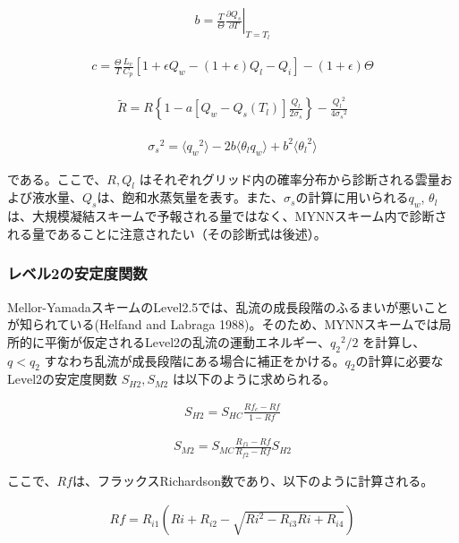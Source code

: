 \begin{eqnarray}b=\frac{T}{\Theta}\left.\frac{\partial Q_s}{\partial T}\right|_{T=T_l}\end{eqnarray}

\begin{eqnarray}c=\frac{\Theta}{T}\frac{L_v}{C_p}\left[1+\epsilon Q_w-(1+\epsilon)Q_l-Q_i\right]-(1+\epsilon)\Theta\end{eqnarray}

\begin{eqnarray}\tilde{R}=R\left\{1-a\left[Q_w-Q_s(T_l)\right]\frac{Q_l}{2\sigma_s}\right\}-\frac{{Q_l}^2}{4{\sigma_s}^2}\end{eqnarray}

\begin{eqnarray}{\sigma_s}^2=\langle {q_w}^2 \rangle -2b \langle \theta_l q_w \rangle + b^2\langle {\theta_l}^2 \rangle\end{eqnarray}

である。ここで、\(R,Q_l\) はそれぞれグリッド内の確率分布から診断される雲量および液水量、\(Q_s\)は、飽和水蒸気量を表す。また、\(\sigma_s\)の計算に用いられる\(q_w\),
\(\theta_l\)は、大規模凝結スキームで予報される量ではなく、MYNNスキーム内で診断される量であることに注意されたい（その診断式は後述）。

\hypertarget{ux30ecux30d9ux30eb2ux306eux5b89ux5b9aux5ea6ux95a2ux6570}{%
\subsubsection{レベル2の安定度関数}\label{ux30ecux30d9ux30eb2ux306eux5b89ux5b9aux5ea6ux95a2ux6570}}

Mellor-YamadaスキームのLevel2.5では、乱流の成長段階のふるまいが悪いことが知られている(Helfand and Labraga
1988)。そのため、MYNNスキームでは局所的に平衡が仮定されるLevel2の乱流の運動エネルギー、\({q_2}^2/2\) を計算し、\(q<q_2\)
すなわち乱流が成長段階にある場合に補正をかける。\(q_2\)の計算に必要なLevel2の安定度関数 \(S_{H2},S_{M2}\) は以下のように求められる。

\begin{eqnarray}S_{H2}=S_{HC}\frac{Rf_c-Rf}{1-Rf}\end{eqnarray}

\begin{eqnarray}S_{M2}=S_{MC}\frac{R_{f1}-Rf}{R_{f2}-Rf}S_{H2}\end{eqnarray}

ここで、\(Rf\)は、フラックスRichardson数であり、以下のように計算される。

\begin{eqnarray}Rf=R_{i1}\left(Ri+R_{i2}-\sqrt{Ri^2-R_{i3}Ri+R_{i4}}\right)\end{eqnarray}

